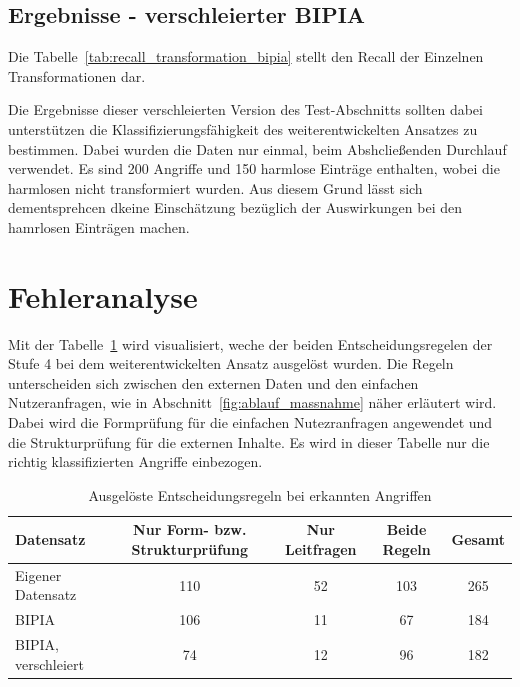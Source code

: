 \subsection{Ergebnisse - verschleierter BIPIA}

Die Tabelle~\ref{tab:recall_transformation_bipia} stellt den Recall der Einzelnen Transformationen dar.

\begin{table}[htbp]
\centering
\caption{Recall je Transformation auf dem verschleierten BIPIA-Datensatz}
\label{tab:recall_transformation_bipia}

\end{table}

Die Ergebnisse dieser verschleierten Version des Test-Abschnitts sollten dabei unterstützen die Klassifizierungsfähigkeit des weiterentwickelten Ansatzes zu 
bestimmen. Dabei wurden die Daten nur einmal, beim Abshcließenden Durchlauf verwendet. Es sind 200 Angriffe und 150 harmlose Einträge enthalten, wobei die 
harmlosen nicht transformiert wurden. Aus diesem Grund lässt sich dementsprehcen dkeine Einschätzung bezüglich der Auswirkungen bei den hamrlosen Einträgen 
machen. 

\section{Fehleranalyse}\label{sec:fehleranalyse}

Mit der Tabelle~\ref{tab:regeln} wird visualisiert, weche der beiden Entscheidungsregelen der Stufe 4 bei dem weiterentwickelten Ansatz ausgelöst wurden. Die Regeln 
unterscheiden sich zwischen den externen Daten und den einfachen Nutzeranfragen, wie in Abschnitt~\ref{fig:ablauf_massnahme} näher erläutert wird. Dabei wird die
Formprüfung für die einfachen Nutezranfragen angewendet und die Strukturprüfung für die externen Inhalte. Es wird in dieser Tabelle nur die richtig klassifizierten
Angriffe einbezogen. 

\begin{table}[htbp]
\centering
\small
\caption{Ausgelöste Entscheidungsregeln bei erkannten Angriffen}
\label{tab:regeln}
\begin{tabularx}{\textwidth}{X c c c c}
\toprule
\textbf{Datensatz} & \textbf{Nur Form- bzw. Strukturprüfung} & \textbf{Nur Leitfragen} & \textbf{Beide Regeln} & Gesamt \\
\midrule
Eigener Datensatz & 110 & 52 & 103 & 265 \\
BIPIA & 106 & 11 & 67 & 184 \\
BIPIA, verschleiert & 74 & 12 & 96 & 182 \\
\bottomrule
\end{tabularx}
\end{table}

